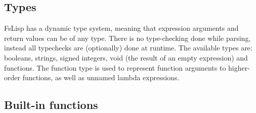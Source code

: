 \documentclass[11pt]{article}
\begin{document}
    \subsection{Types}

    FsLisp has a dynamic type system, meaning that expression arguments and return values can be of any type. There is no type-checking done while parsing,
    instead all typechecks are (optionally) done at runtime. The available types are: booleans, strings, signed integers, void (the result of an empty
    expression) and functions. The function type is used to represent function arguments to higher-order functions, as well as unnamed lambda expressions.

    \subsection{Built-in functions}
\end{document}
